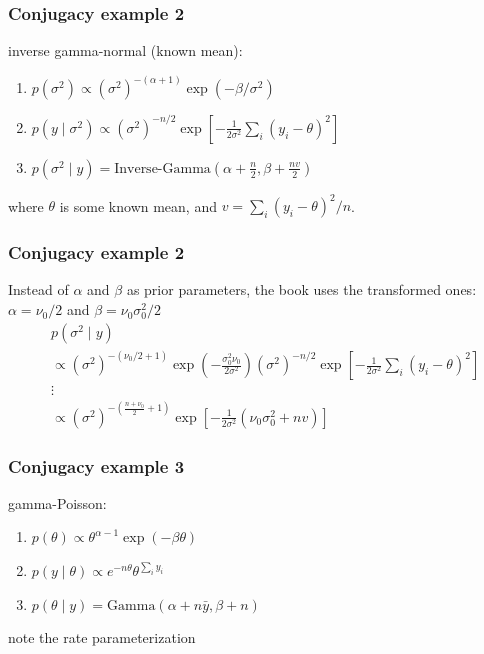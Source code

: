 \documentclass{beamer}
\begin{document}

\begin{frame}[fragile]
\frametitle{Conjugacy example 2}


inverse gamma-normal (known mean):
\begin{enumerate}
\item $p(\sigma^2 ) \propto (\sigma^2)^{-(\alpha+1)} \exp\left( -\beta / \sigma^2 \right)$
\item $p(y \mid \sigma^2) \propto (\sigma^2)^{-n/2} \exp\left[-\frac{1}{2 \sigma^2} \sum_i \left(y_i - \theta \right)^2 \right] $
\item $p(\sigma^2 \mid y) = \text{Inverse-Gamma}\left(\alpha + \frac{n }{2}, \beta + \frac{  n v }{2} \right)$
\end{enumerate}
where $\theta$ is some known mean, and $v = \sum_i(y_i - \theta)^2 / n$.

\end{frame}



\begin{frame}[fragile]
\frametitle{Conjugacy example 2}

Instead of $\alpha$ and $\beta$ as prior parameters, the book uses the transformed ones: $\alpha = \nu_0/2$ and $\beta = \nu_0 \sigma^2_0/2$
\begin{align*}
&p(\sigma^2 \mid y)\\
&\propto (\sigma^2)^{-(\nu_0/2+1)} \exp\left( - \frac{\sigma_0^2 \nu_0}{ 2\sigma^2} \right)(\sigma^2)^{-n/2} \exp\left[-\frac{1}{2 \sigma^2} \sum_i \left(y_i - \theta \right)^2 \right] \\
& \vdots \tag{homework} \\
&\propto (\sigma^2)^{-(\frac{n + \nu_0}{2}  +1)} \exp\left[-\frac{1}{2 \sigma^2}\left(\nu_0 \sigma^2_0 + n v  \right)  \right]
\end{align*}

\end{frame}


\begin{frame}[fragile]
\frametitle{Conjugacy example 3}


gamma-Poisson:
\begin{enumerate}
\item $p(\theta) \propto \theta^{\alpha - 1}\exp\left( - \beta \theta \right)$
\item $p(y \mid \theta) \propto e^{-n\theta} \theta^{\sum_i y_i}$
\item $p(\theta \mid y)  = \text{Gamma}(\alpha + n\bar{y}, \beta + n)$
\end{enumerate}

note the rate parameterization
\end{frame}
\end{document}
